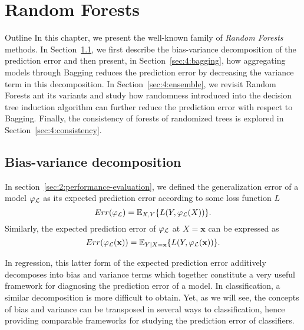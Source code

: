\chapter{Random Forests}\label{ch:forest}

\begin{remark}{Outline}
In this chapter, we present the well-known family of \textit{Random Forests}
methods. In Section~\ref{sec:4:bias-variance}, we first describe the
bias-variance decomposition of the prediction error and then present, in
Section~\ref{sec:4:bagging}, how aggregating models through Bagging reduces the prediction
error by decreasing the variance term in this decomposition. In
Section~\ref{sec:4:ensemble}, we revisit Random Forests ant its variants and
study how randomness introduced into the decision tree induction algorithm can
further reduce the prediction error with respect to Bagging. Finally, the
consistency of forests of randomized trees is explored in
Section~\ref{sec:4:consistency}.
\end{remark}

\section{Bias-variance decomposition}
\label{sec:4:bias-variance}


In section~\ref{sec:2:performance-evaluation}, we defined the generalization
error of a model $\varphi_{\cal L}$ as its expected prediction error
according to some loss function $L$
\begin{equation}
Err(\varphi_{\cal L}) = \mathbb{E}_{X,Y} \{ L(Y, \varphi_{\cal L}(X)) \}.
\end{equation}
Similarly, the expected prediction error of $\varphi_{\cal L}$ at $X=\mathbf{x}$
can be expressed as
\begin{equation}
Err(\varphi_{\cal L}(\mathbf{x})) = \mathbb{E}_{Y|X=\mathbf{x}} \{ L(Y, \varphi_{\cal L}(\mathbf{x})) \}.\label{eqn:4:generalization-error:x}
\end{equation}

In regression, this latter form of the expected prediction error additively
decomposes into bias and variance terms which together constitute a very useful
framework for diagnosing the prediction error of a model. In classification, a
similar decomposition is more difficult to obtain. Yet, as we will see, the
concepts of bias and variance can be transposed in several ways to
classification, hence providing comparable frameworks for studying the prediction
error of classifiers.

